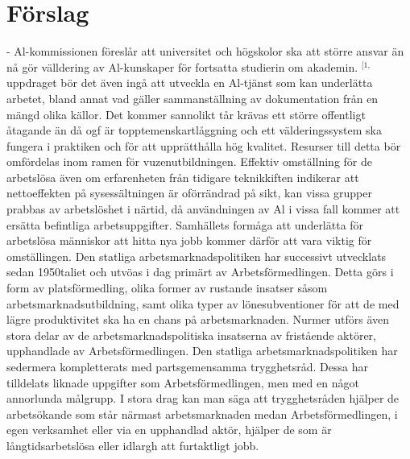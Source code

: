 {{{{{{{{{{{{\section*{Förslag}
- Al-kommissionen föreslår att universitet och högskolor ska att större ansvar än nå gör välldering av Al-kunskaper för fortsatta studierin om akademin. \({ }^{[1,}\) uppdraget bör det även ingå att utveckla en Al-tjänst som kan underlätta arbetet, bland annat vad gäller sammanställning av dokumentation från en mängd olika källor. Det kommer sannolikt tår krävas ett större offentligt åtagande än då ogf är topptemenskartlåggning och ett välderingssystem ska fungera i praktiken och för att upprätthålla hög kvalitet. Resurser till detta bör omfördelas inom ramen för vuzenutbildningen.
Effektiv omställning för de arbetslösa även om erfarenheten från tidigare teknikkiften indikerar att nettoeffekten på sysessältningen är oförrändrad på sikt, kan vissa grupper prabbas av arbetslöshet i närtid, då användningen av Al i vissa fall kommer att ersätta befintliga arbetsuppgifter. Samhällets formåga att underlätta för arbetslösa människor att hitta nya jobb kommer därför att vara viktig för omställingen. Den statliga arbetsmarknadspolitiken har successivt utvecklats sedan 1950taliet och utvöas i dag primärt av Arbetsförmedlingen. Detta görs i form av platsförmedling, olika former av rustande insatser såsom arbetsmarknadsutbildning, samt olika typer av lönesubventioner för att de med lägre produktivitet ska ha en chans på arbetsmarknaden.
Nurmer utförs även stora delar av de arbetsmarknadspolitiska insatserna av fristående aktörer, upphandlade av Arbetsförmedlingen. Den statliga arbetsmarknadspolitiken har sedermera kompletterats med partsgemensamma trygghetsråd. Dessa har tilldelats liknade uppgifter som Arbetsförmedlingen, men med en något annorlunda målgrupp. I stora drag kan man säga att trygghetsråden hjälper de arbetsökande som står närmast arbetsmarknaden medan Arbetsförmedlingen, i egen verksamhet eller via en upphandlad aktör, hjälper de som är långtidsarbetslösa eller idlargh att furtaktligt jobb.
}}}}}}}}}}}}
